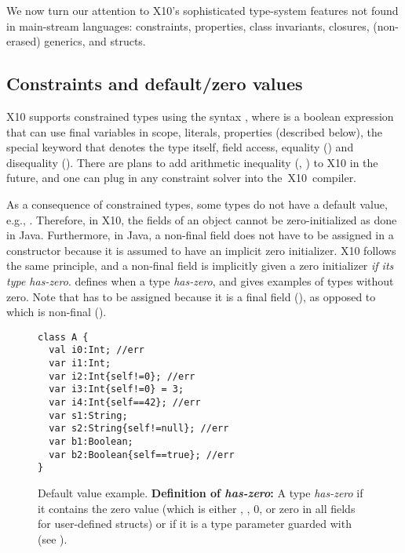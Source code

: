 We now turn our attention to X10's sophisticated type-system
    features not found in main-stream languages:
    constraints, properties, class invariants, closures, (non-erased) generics, and structs.

\subsection{Constraints and default/zero values}
X10 supports constrained types using the syntax ,
    where  is a boolean expression that can use final variables in scope,
    literals, properties (described below),
    the special keyword 
    that denotes the type itself,
    field access, equality (\code{==}) and disequality (\code{!=}).
There are plans to add arithmetic inequality (\code{<}, \code{<=})
    to X10 in the future,
    and one can plug in any constraint solver into the~X10~compiler.

As a consequence of constrained types,
    some types do not have a default value, e.g., .
Therefore, in X10, the fields of an object cannot be zero-initialized as done in Java.
Furthermore, in Java, a non-final field does not have to be assigned in a constructor
    because it is assumed to have an implicit zero initializer.
X10 follows the same principle, and a non-final field is implicitly given a zero initializer
    \emph{if its type has-zero}.
 defines when a type \emph{has-zero},
    and gives examples of types without zero.
Note that  has to be assigned because it is a final field (),
    as opposed to  which is non-final ().

\begin{figure}
\vspace{-0.2cm}\begin{lstlisting}
class A {
  val i0:Int; //err
  var i1:Int;
  var i2:Int{self!=0}; //err
  var i3:Int{self!=0} = 3;
  var i4:Int{self==42}; //err
  var s1:String;
  var s2:String{self!=null}; //err
  var b1:Boolean;
  var b2:Boolean{self==true}; //err
}
\end{lstlisting}\vspace{-0.2cm}
\caption{Default value example.
    \textbf{Definition of \emph{has-zero}:}
        {A type \emph{has-zero} if it contains the zero value
            (which is either , , 0, or
                zero in all fields for user-defined structs)
            or if it is a type parameter guarded with  (see ).}
    }
\label{Figure:Constraints}
\end{figure}


